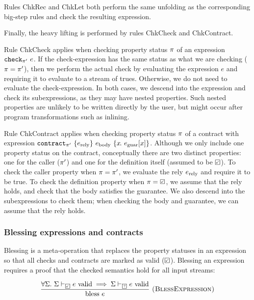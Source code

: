 Rules {\sc ChkRec} and {\sc ChkLet} both perform the same unfolding as the corresponding big-step rules and check the resulting expression.

Finally, the heavy lifting is performed by rules {\sc ChkCheck} and {\sc ChkContract}.

Rule {\sc ChkCheck} applies when checking property status $\pi$ of an expression $\texttt{check}_{\pi'}~e$.
If the check-expression has the same status as what we are checking ($\pi = \pi'$), then we perform the actual check by evaluating the expression $e$ and requiring it to evaluate to a stream of trues.
Otherwise, we do not need to evaluate the check-expression.
In both cases, we descend into the expression and check its subexpressions, as they may have nested properties.
Such nested properties are unlikely to be written directly by the user, but might occur after program transformations such as inlining.

Rule {\sc ChkContract} applies when checking property status $\pi$ of a contract with expression $\texttt{contract}_{\pi'}~\{e_{\text{rely}}\}~e_{\text{body}}~\{x\hspace{-0.1em}.~e_{\text{guar}}[x]\}$.
Although we only include one property status on the contract, conceptually there are two distinct properties: one for the caller ($\pi'$) and one for the definition itself (assumed to be $\PSValid$).
To check the caller property when $\pi = \pi'$, we evaluate the rely $e_{\text{rely}}$ and require it to be true.
To check the definition property when $\PStatus = \PSValid$, we assume that the rely holds, and check that the body satisfies the guarantee.
We also descend into the subexpressions to check them; when checking the body and guarantee, we can assume that the rely holds.

\subsubsection{Blessing expressions and contracts}
\label{s:core:blessing}

Blessing is a meta-operation that replaces the property statuses in an expression so that all checks and contracts are marked as valid ($\PSValid$).
Blessing an expression requires a proof that the checked semantics hold for all input streams:

$$
\ruleIN{
  \forall \Sigma.~
  \semcheck{\Sigma}{\PSValid}{e}
  \implies
  \semcheck{\Sigma}{\PSUnknown}{e}
}{\text{bless}~e}{BlessExpression}
$$

